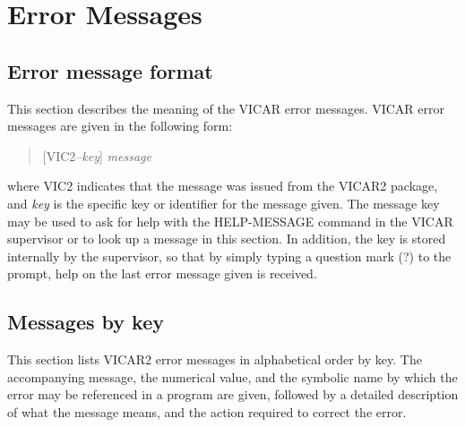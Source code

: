 \newpage
\section{Error Messages}
\label{errors}
\subsection{Error message format}
This section describes the meaning of the VICAR error messages.
VICAR error messages are given in the following form:
\begin{quote}
[VIC2--{\em key}] {\em message}
\end{quote}
where VIC2 indicates that the message was issued from the VICAR2
package, and {\em key} is the specific key or identifier for the message
given.  The message key may be used to ask for help with the
HELP-MESSAGE command in the VICAR supervisor or to look up a message
in this section.  In addition, the key is stored internally by the 
supervisor, so that by simply typing a question mark (?) to the 
prompt, help on the last error message given is received.
\subsection{Messages by key}
This section lists VICAR2 error messages in alphabetical order by
key.  The accompanying message, the numerical value, and the symbolic
name by which the error may be referenced in a program are given,
followed by a detailed description of what the message means, and the
action required to correct the error.


